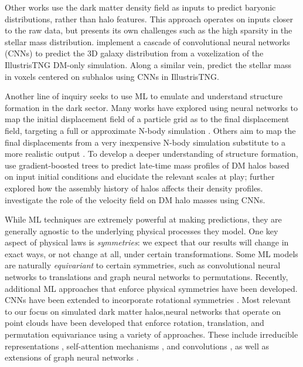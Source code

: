 Other works use the dark matter density field as inputs to predict baryonic distributions, rather than halo features.
This approach operates on inputs closer to the raw data, but presents its own challenges such as the high sparsity in the stellar mass distribution.
\cite{yip_dark_2019} implement a cascade of convolutional neural networks (CNNs) to predict the 3D galaxy distribution from a voxelization of the IllustrisTNG DM-only simulation.
Along a similar vein, \cite{kasmanoff_dm2gal_2020} predict the stellar mass in voxels centered on subhalos using CNNs in IllustrisTNG.

Another line of inquiry seeks to use ML to emulate and understand structure formation in the dark sector.
Many works have explored using neural networks to map the initial displacement field of a particle grid as to the final displacement field, targeting a full or approximate N-body simulation \citep{he_learning_2018,jamieson_field_2022}.
Others aim to map the final displacements from a very inexpensive N-body simulation substitute to a more realistic output \citep{piras_fast_2023}. 
To develop a deeper understanding of structure formation, \cite{lucie-smith_insights_2022} use gradient-boosted trees to predict late-time mass profiles of DM halos based on input initial conditions and elucidate the relevant scales at play; \cite{lucie-smith_explaining_2023} further explored how the assembly history of halos affects their density profiles.
\cite{etezad-razavi_unravelling_2023} investigate the role of the velocity field on DM halo masses using CNNs.

While ML techniques are extremely powerful at making predictions, they are generally agnostic to the underlying physical processes they model.
One key aspect of physical laws is \emph{symmetries}: we expect that our results will change in exact ways, or not change at all, under certain transformations.
Some ML models are naturally \emph{equivariant} to certain symmetries, such as convolutional neural networks to translations and graph neural networks to permutations.
Recently, additional ML approaches that enforce physical symmetries have been developed.
CNNs have been extended to incorporate rotational symmetries \citep{cohen2019gauge,wang2021incorporating,ocampo_scalable_2023}.
Most relevant to our focus on simulated dark matter halos,neural networks that operate on point clouds have been developed that enforce rotation, translation, and permutation equivariance using a variety of approaches.
These include irreducible representations \citep{thomas2018tensor}, self-attention mechanisms \citep{fuchs2020se}, and convolutions \citep{kondor2018covariant,zhang2019rotation}, as well as extensions of graph neural networks \cite{Satorras2021}.

